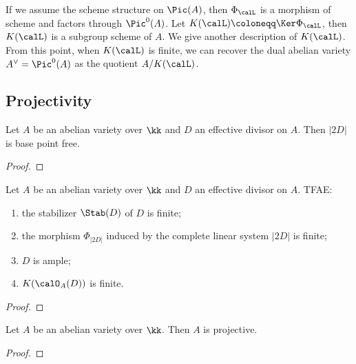     If we assume the scheme structure on \(\Pic(A)\), then \(\Phi_\calL\) is a morphism of scheme and factors through \(\Pic^0(A)\).
    Let \(K(\calL) \coloneqq \Ker \Phi_\calL\), then \(K(\calL)\) is a subgroup scheme of \(A\).
    We give another description of \(K(\calL)\).
    From this point, when \(K(\calL)\) is finite, we can recover the dual abelian variety \(A^\vee = \Pic^0(A)\) as the quotient \(A/K(\calL)\).



\subsection{Projectivity}

    \begin{proposition}\label{prop:2D_is_base_point_free}
        Let \(A\) be an abelian variety over \(\kk\) and \(D\) an effective divisor on \(A\).
        Then \(|2D|\) is base point free.
    \end{proposition}
    \begin{proof}
    \end{proof}

    \begin{theorem}\label{thm:ample_criteria_for_abelian_varieties}
        Let \(A\) be an abelian variety over \(\kk\) and \(D\) an effective divisor on \(A\).
        TFAE:
        \begin{enumerate}
            \item the stabilizer \(\Stab(D)\) of \(D\) is finite;
            \item the morphism \(\Phi_{|2D|}\) induced by the complete linear system \(|2D|\) is finite;
            \item \(D\) is ample;
            \item \(K(\calO_A(D))\) is finite.
        \end{enumerate}
    \end{theorem}
    \begin{proof}
    \end{proof}

    \begin{theorem}\label{thm: abelian varieties are projective}
        Let $A$ be an abelian variety over $\kk$. 
        Then $A$ is projective.
    \end{theorem}
    \begin{proof}
    \end{proof}

